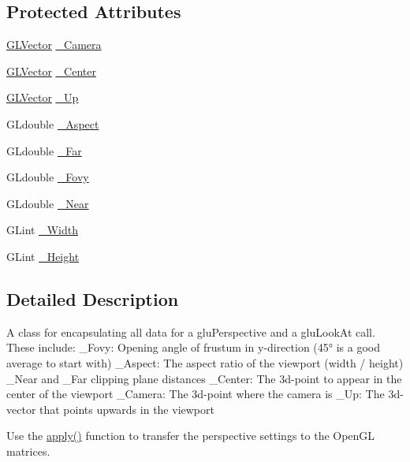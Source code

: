 \subsection*{\-Protected \-Attributes}
\begin{DoxyCompactItemize}
\item 
\hyperlink{classGLVector}{\-G\-L\-Vector} \hyperlink{classGLPerspective_a2bb94077d185cb85461a7c0eb53ab334}{\-\_\-\-Camera}
\item 
\hyperlink{classGLVector}{\-G\-L\-Vector} \hyperlink{classGLPerspective_acee62098421f0b59a62b1637f6ba586f}{\-\_\-\-Center}
\item 
\hyperlink{classGLVector}{\-G\-L\-Vector} \hyperlink{classGLPerspective_a69c80f817c645be3adc602e0adaf036c}{\-\_\-\-Up}
\item 
\-G\-Ldouble \hyperlink{classGLPerspective_a7355a44ee8fc58dedd79904ebe3093cb}{\-\_\-\-Aspect}
\item 
\-G\-Ldouble \hyperlink{classGLPerspective_a73b5c97c5d9b4c138eeeeff904c7ca57}{\-\_\-\-Far}
\item 
\-G\-Ldouble \hyperlink{classGLPerspective_a54617fb0638ba31e316b61c3dfb83c96}{\-\_\-\-Fovy}
\item 
\-G\-Ldouble \hyperlink{classGLPerspective_a7d6f75d52248d480136e8be881e9d4e6}{\-\_\-\-Near}
\item 
\-G\-Lint \hyperlink{classGLPerspective_a53d38f9b18e35f1d669c72e5c00a8f85}{\-\_\-\-Width}
\item 
\-G\-Lint \hyperlink{classGLPerspective_a6e4c1f9b9e2d2f98edfc6657e5b23a0f}{\-\_\-\-Height}
\end{DoxyCompactItemize}


\subsection{\-Detailed \-Description}
\-A class for encapsulating all data for a glu\-Perspective and a glu\-Look\-At call. \-These include\-: \-\_\-\-Fovy\-: \-Opening angle of frustum in y-\/direction (45° is a good average to start with) \-\_\-\-Aspect\-: \-The aspect ratio of the viewport (width / height) \-\_\-\-Near and \-\_\-\-Far clipping plane distances \-\_\-\-Center\-: \-The 3d-\/point to appear in the center of the viewport \-\_\-\-Camera\-: \-The 3d-\/point where the camera is \-\_\-\-Up\-: \-The 3d-\/vector that points upwards in the viewport

\-Use the \hyperlink{classGLPerspective_a91531aa2c2fab0c53a49c0fac32aac56}{apply()} function to transfer the perspective settings to the \-Open\-G\-L matrices.

